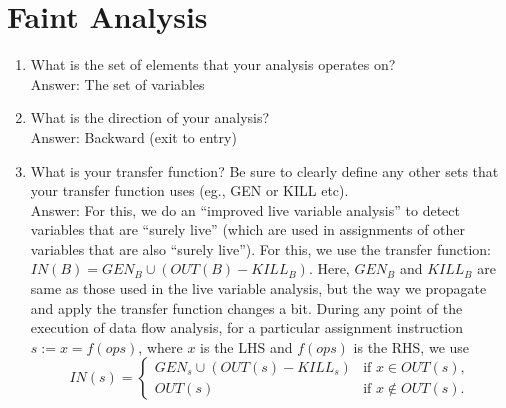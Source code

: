 \section{Faint Analysis}

\begin{enumerate}
\item What is the set of elements that your analysis operates on? \\
Answer: The set of variables
\item What is the direction of your analysis? \\
Answer: Backward (exit to entry)
\item What is your transfer function? Be sure to clearly define any other sets that your transfer function uses (eg., GEN or KILL etc). \\
Answer: For this, we do an ``improved live variable analysis'' to detect variables that are ``surely live'' (which are used in assignments of other variables that are also ``surely live''). For this, we use the transfer function: $IN(B) = GEN_B \cup (OUT(B)-KILL_B)$. Here, $GEN_B$ and $KILL_B$ are same as those used in the live variable analysis, but the way we propagate and apply the transfer function changes a bit. During any point of the execution of data flow analysis, for a particular assignment instruction $s:= x = f(ops)$, where $x$ is the LHS and $f(ops)$ is the RHS, we use
\[
IN(s) = \left\{ 
\begin{array}{ll}
GEN_s \cup (OUT(s)-KILL_s) & \mbox{if } x \in OUT(s),\\
OUT(s) & \mbox{if } x \notin OUT(s).
\end{array}
\right.
\]


\end{enumerate}
